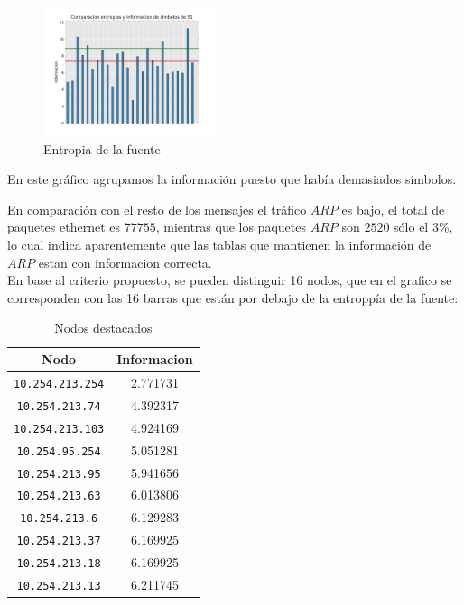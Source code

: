 \begin{figure}[h]
  \centering
    \includegraphics[width=0.45\textwidth]{entropia_red_despegar.png}
  \caption{Entropia de la fuente}
  \label{entropia-s1}
\end{figure}
En este gráfico agrupamos la información puesto que había demasiados símbolos.

En comparación con el resto de los mensajes el tráfico $ARP$ es bajo, el total de paquetes ethernet es $77755$, mientras que los paquetes $ARP$ son $2520$ sólo el 3\%, lo cual indica aparentemente que las tablas que mantienen la información de $ARP$ estan con informacion correcta. 
\\En base al criterio propuesto, se pueden distinguir 16 nodos, que en el grafico se corresponden con las 16 barras que están por debajo de la entroppía de la fuente:   

    \begin{table}[ht]\begin{center}
      \begin{tabular}{|c|c|}
      \hline
      \textbf{Nodo} & \textbf{Informacion} \\ \hline
      \texttt{10.254.213.254}&2.771731\\ \hline
      \texttt{10.254.213.74}&4.392317\\ \hline
      \texttt{10.254.213.103}&4.924169\\ \hline
      \texttt{10.254.95.254}&5.051281 \\ \hline
      \texttt{10.254.213.95}&5.941656 \\ \hline
      \texttt{10.254.213.63}&6.013806 \\ \hline
      \texttt{10.254.213.6}&6.129283 \\ \hline
      \texttt{10.254.213.37}&6.169925 \\ \hline
      \texttt{10.254.213.18}&6.169925 \\ \hline
      \texttt{10.254.213.13}&6.211745 \\ \hline
      \end{tabular}
      \caption{Nodos destacados}
      \label{Nodos-destacados}
    \end{center}\end{table}

